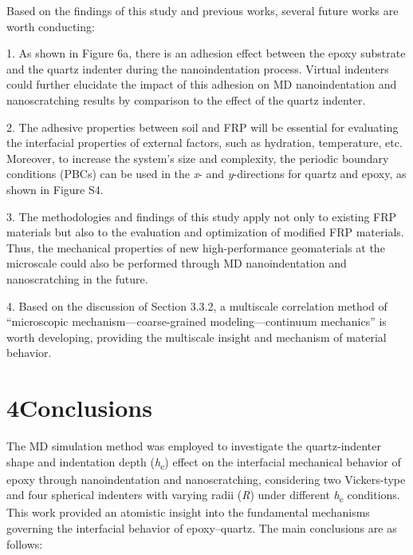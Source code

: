 \documentclass{article}
\begin{document}
Based on the findings of this study and previous works, several future works are worth conducting:

\begin{hangpars}
1. As shown in Figure 6a, there is an adhesion effect between the epoxy substrate and the quartz indenter during the nanoindentation process. Virtual indenters could further elucidate the impact of this adhesion on MD nanoindentation and nanoscratching results by comparison to the effect of the quartz indenter.

2. The adhesive properties between soil and FRP will be essential for evaluating the interfacial properties of external factors, such as hydration, temperature, etc. Moreover, to increase the system’s size and complexity, the periodic boundary conditions (PBCs) can be used in the \emph{x}- and \emph{y}-directions for quartz and epoxy, as shown in Figure S4.

3. The methodologies and findings of this study apply not only to existing FRP materials but also to the evaluation and optimization of modified FRP materials. Thus, the mechanical properties of new high-performance geomaterials at the microscale could also be performed through MD nanoindentation and nanoscratching in the future.

4. Based on the discussion of Section 3.3.2, a multiscale correlation method of “microscopic mechanism—coarse-grained modeling—continuum mechanics” is worth developing, providing the multiscale insight and mechanism of material behavior.
\end{hangpars}

\section*{4\quad Conclusions}

The MD simulation method was employed to investigate the quartz-indenter shape and indentation depth (\emph{h}\textsubscript{c}) effect on the interfacial mechanical behavior of epoxy through nanoindentation and nanoscratching, considering two Vickers-type and four spherical indenters with varying radii (\emph{R}) under different \emph{h}\textsubscript{c} conditions. This work provided an atomistic insight into the fundamental mechanisms governing the interfacial behavior of epoxy–quartz. The main conclusions are as follows:
\end{document}
